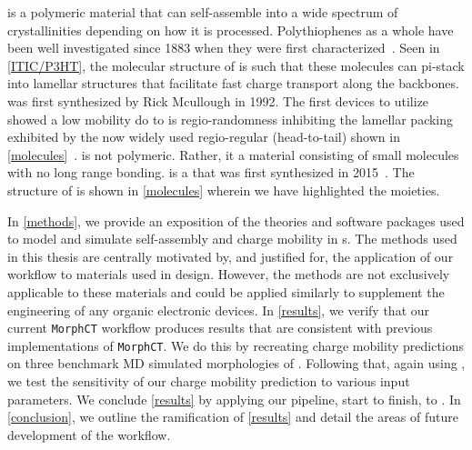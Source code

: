  is a polymeric material that can self-assemble into a wide spectrum of
crystallinities depending on how it is processed.
Polythiophenes as a whole have been well investigated 
since 1883 when they were first characterized~\cite{Poelking2014}.
Seen in \autoref{ITIC/P3HT}, the molecular structure of 
is such that these molecules can pi-stack into lamellar structures that facilitate fast charge transport along
the backbones.  was first synthesized by Rick Mcullough in 1992. The first devices to utilize  showed
a low mobility do to is regio-randomness inhibiting the lamellar packing exhibited by the now widely used
regio-regular (head-to-tail)  shown in \autoref{molecules}~\cite{Zaumseil2014}. 
 is not polymeric. Rather, it a material consisting of small molecules with no long range bonding.
 is a  that was first synthesized in 2015~\cite{Bai2015}. The structure of  is shown in
\autoref{molecules} wherein we have highlighted the moieties.  

In \autoref{methods}, we
provide an exposition of the theories and software packages used to model and simulate self-assembly and
charge mobility in
s.
The methods used in this thesis are centrally motivated by, and justified for, 
the application of our workflow to materials
used in  design. However, the methods are
not exclusively applicable to these materials and could be applied similarly to supplement the engineering of any organic
electronic devices. 
In \autoref{results}, we verify that our current \texttt{MorphCT} workflow produces results that are consistent with previous implementations of \texttt{MorphCT}. We do this by recreating charge mobility predictions on three benchmark MD simulated morphologies of . 
Following that, again using , we test the sensitivity of our charge mobility prediction to various input parameters. We conclude \autoref{results} by applying our pipeline,
start to finish, to . 
In \autoref{conclusion}, we outline the ramification of \autoref{results} and detail the areas of future development of the workflow. 

